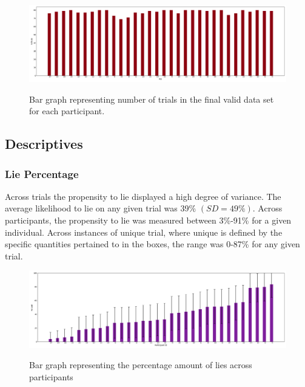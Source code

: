 \documentclass[man, floatsintext]{apa7}
\begin{document}
\begin{figure}[H]
	\includegraphics[width=\linewidth]{../plots/RESPONSE/NTrialsByPID.png}
	\label{fig:NTrialsByPID}
	\caption{Bar graph representing number of trials in the final valid data set for each participant.}
\end{figure}

\subsection{Descriptives}

\subsubsection{Lie Percentage}

Across trials the propensity to lie displayed a high degree of variance. The average likelihood to lie on any given trial was 39\% $(SD = 49\%)$. Across participants, the propensity to lie was measured between 3\%-91\% for a given individual. Across instances of unique trial, where unique is defined by the specific quantities pertained to in the boxes, the range was 0-87\% for any given trial.

\begin{figure}[H]
	\includegraphics[width=\linewidth]{../plots/RESPONSE/PIDPercentLiesPlot.png}
	\label{fig:PIDPercentLiesPlot}
	\caption{Bar graph representing the percentage amount of lies across participants}
\end{figure}
\end{document}
